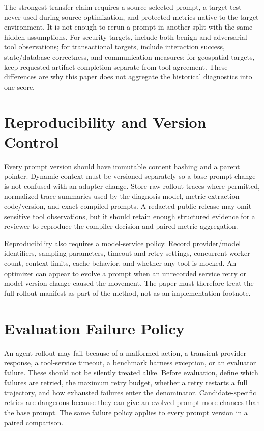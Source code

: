 \documentclass[10pt]{article}
\begin{document}
The strongest transfer claim requires a source-selected prompt, a target test never used during source optimization, and protected metrics native to the target environment. It is not enough to rerun a prompt in another split with the same hidden assumptions. For security targets, include both benign and adversarial tool observations; for transactional targets, include interaction success, state/database correctness, and communication measures; for geospatial targets, keep requested-artifact completion separate from tool agreement. These differences are why this paper does not aggregate the historical diagnostics into one score.

\section{Reproducibility and Version Control}
Every prompt version should have immutable content hashing and a parent pointer. Dynamic context must be versioned separately so a base-prompt change is not confused with an adapter change. Store raw rollout traces where permitted, normalized trace summaries used by the diagnosis model, metric extraction code/version, and exact compiled prompts. A redacted public release may omit sensitive tool observations, but it should retain enough structured evidence for a reviewer to reproduce the compiler decision and paired metric aggregation.

Reproducibility also requires a model-service policy. Record provider/model identifiers, sampling parameters, timeout and retry settings, concurrent worker count, context limits, cache behavior, and whether any tool is mocked. An optimizer can appear to evolve a prompt when an unrecorded service retry or model version change caused the movement. The paper must therefore treat the full rollout manifest as part of the method, not as an implementation footnote.

\section{Evaluation Failure Policy}
An agent rollout may fail because of a malformed action, a transient provider response, a tool-service timeout, a benchmark harness exception, or an evaluator failure. These should not be silently treated alike. Before evaluation, define which failures are retried, the maximum retry budget, whether a retry restarts a full trajectory, and how exhausted failures enter the denominator. Candidate-specific retries are dangerous because they can give an evolved prompt more chances than the base prompt. The same failure policy applies to every prompt version in a paired comparison.
\end{document}
